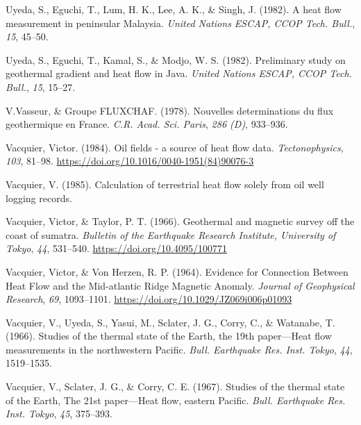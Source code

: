 \documentclass[draft,linenumbers]{agujournal2018}
\begin{document}
\leavevmode{}%
Uyeda, S., Eguchi, T., Lum, H. K., Lee, A. K., \& Singh, J. (1982). A
heat flow measurement in peninsular {Malaysia}. \emph{United Nations
ESCAP, CCOP Tech. Bull.}, \emph{15}, 45--50.

\leavevmode{}%
Uyeda, S., Eguchi, T., Kamal, S., \& Modjo, W. S. (1982). Preliminary
study on geothermal gradient and heat flow in {Java}. \emph{United
Nations ESCAP, CCOP Tech. Bull.}, \emph{15}, 15--27.

\leavevmode{}%
V.Vasseur, \& Groupe FLUXCHAF. (1978). Nouvelles determinations du flux
geothermique en {France}. \emph{C.R. Acad. Sci. Paris}, \emph{286 (D)},
933--936.

\leavevmode{}%
Vacquier, Victor. (1984). Oil fields - a source of heat flow data.
\emph{Tectonophysics}, \emph{103}, 81--98.
\url{https://doi.org/10.1016/0040-1951(84)90076-3}

\leavevmode{}%
Vacquier, V. (1985). Calculation of terrestrial heat flow solely from
oil well logging records.

\leavevmode{}%
Vacquier, Victor, \& Taylor, P. T. (1966). Geothermal and magnetic
survey off the coast of sumatra. \emph{Bulletin of the Earthquake
Research Institute, University of Tokyo}, \emph{44}, 531--540.
\url{https://doi.org/10.4095/100771}

\leavevmode{}%
Vacquier, Victor, \& Von Herzen, R. P. (1964). {Evidence for Connection
Between Heat Flow and the Mid-atlantic Ridge Magnetic Anomaly}.
\emph{Journal of Geophysical Research}, \emph{69}, 1093--1101.
\url{https://doi.org/10.1029/JZ069i006p01093}

\leavevmode{}%
Vacquier, V., Uyeda, S., Yasui, M., Sclater, J. G., Corry, C., \&
Watanabe, T. (1966). Studies of the thermal state of the {Earth, the
19th paper---Heat flow measurements in the northwestern Pacific}.
\emph{Bull. Earthquake Res. Inst. Tokyo}, \emph{44}, 1519--1535.

\leavevmode{}%
Vacquier, V., Sclater, J. G., \& Corry, C. E. (1967). Studies of the
thermal state of the {Earth, The 21st paper---Heat flow, eastern
Pacific}. \emph{Bull. Earthquake Res. Inst. Tokyo}, \emph{45}, 375--393.
\end{document}
